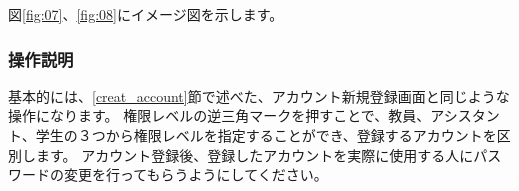図\ref{fig:07}、\ref{fig:08}にイメージ図を示します。

\subsubsection{操作説明}
基本的には、\ref{creat_account}節で述べた、アカウント新規登録画面と同じような操作になります。
権限レベルの逆三角マークを押すことで、教員、アシスタント、学生の３つから権限レベルを指定することができ、登録するアカウントを区別します。
アカウント登録後、登録したアカウントを実際に使用する人にパスワードの変更を行ってもらうようにしてください。




